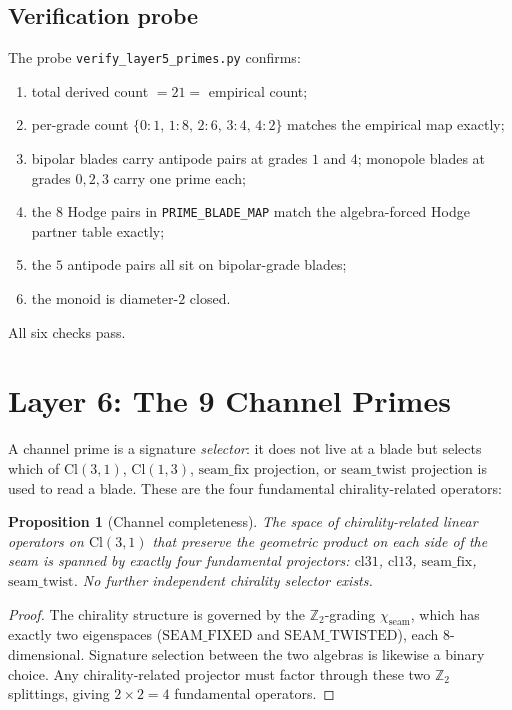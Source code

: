 \documentclass[11pt,a4paper]{article}
\theoremstyle{plain}
\newtheorem{proposition}[theorem]{Proposition}
\theoremstyle{definition}
\theoremstyle{remark}
\numberwithin{equation}{section}
\providecommand{\Cl}{\mathrm{Cl}}
\providecommand{\ZZ}{\mathbb{Z}}
\providecommand{\seamfix}{\mathrm{seam\_fix}}
\providecommand{\seamtwist}{\mathrm{seam\_twist}}
\begin{document}
\subsection{Verification probe}

The probe \texttt{verify\_layer5\_primes.py} confirms:
\begin{enumerate}[label=(\alph*)]
\item total derived count $= 21 =$ empirical count;
\item per-grade count $\{0: 1,\, 1: 8,\, 2: 6,\, 3: 4,\, 4: 2\}$
      matches the empirical map exactly;
\item bipolar blades carry antipode pairs at grades $1$ and $4$;
      monopole blades at grades $0, 2, 3$ carry one prime each;
\item the $8$ Hodge pairs in \texttt{PRIME\_BLADE\_MAP} match the
      algebra-forced Hodge partner table exactly;
\item the $5$ antipode pairs all sit on bipolar-grade blades;
\item the monoid is diameter-$2$ closed.
\end{enumerate}
All six checks pass.


\section{Layer 6: The 9 Channel Primes}\label{sec:layer6}

A channel prime is a signature \emph{selector}: it does not live at
a blade but selects which of $\Cl(3,1)$, $\Cl(1,3)$, $\seamfix$
projection, or $\seamtwist$ projection is used to read a blade.
These are the four fundamental chirality-related operators:

\begin{proposition}[Channel completeness]\label{prop:channels}
The space of chirality-related linear operators on $\Cl(3,1)$ that
preserve the geometric product on each side of the seam is spanned
by exactly four fundamental projectors: $\mathrm{cl31}$,
$\mathrm{cl13}$, $\seamfix$, $\seamtwist$.  No further independent
chirality selector exists.
\end{proposition}

\begin{proof}
The chirality structure is governed by the $\ZZ_2$-grading
$\chi_{\mathrm{seam}}$, which has exactly two eigenspaces
($\mathrm{SEAM\_FIXED}$ and $\mathrm{SEAM\_TWISTED}$), each
$8$-dimensional.  Signature selection between the two algebras is
likewise a binary choice.  Any chirality-related projector must
factor through these two $\ZZ_2$ splittings, giving $2 \times 2 = 4$
fundamental operators.
\end{proof}
\end{document}
